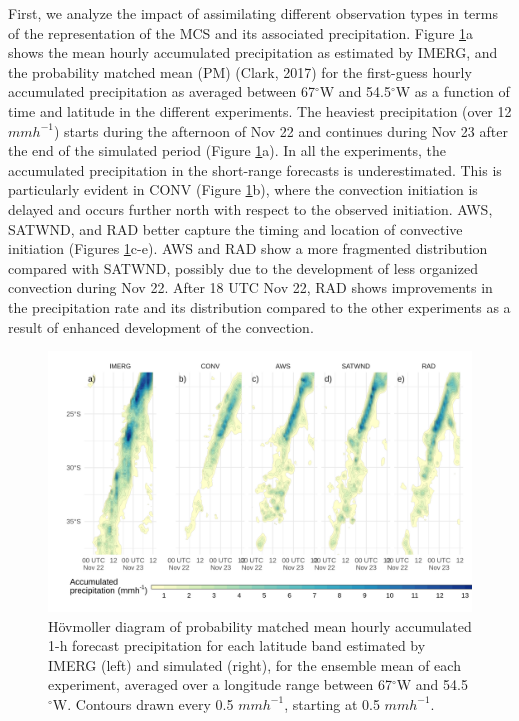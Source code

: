 \documentclass[final,5p,times,twocolumn,authoryear]{elsarticle} %
\begin{document}
First, we analyze the impact of assimilating different observation types in terms of the representation of the MCS and its associated precipitation. Figure \ref{fig:pp-hov}a shows the mean hourly accumulated precipitation as estimated by IMERG, and the probability matched mean (PM) (Clark, 2017) for the first-guess hourly accumulated precipitation as averaged between 67\(^{\circ}\)W and 54.5\(^{\circ}\)W as a function of time and latitude in the different experiments. The heaviest precipitation (over 12 \(mmh^{-1}\)) starts during the afternoon of Nov 22 and continues during Nov 23 after the end of the simulated period (Figure \ref{fig:pp-hov}a). In all the experiments, the accumulated precipitation in the short-range forecasts is underestimated. This is particularly evident in CONV (Figure \ref{fig:pp-hov}b), where the convection initiation is delayed and occurs further north with respect to the observed initiation. AWS, SATWND, and RAD better capture the timing and location of convective initiation (Figures \ref{fig:pp-hov}c-e). AWS and RAD show a more fragmented distribution compared with SATWND, possibly due to the development of less organized convection during Nov 22. After 18 UTC Nov 22, RAD shows improvements in the precipitation rate and its distribution compared to the other experiments as a result of enhanced development of the convection.



\begin{figure}[h]
\includegraphics{../figures/pp-hov-1} \caption{Hövmoller diagram of probability matched mean hourly accumulated 1-h forecast precipitation for each latitude band estimated by IMERG (left) and simulated (right), for the ensemble mean of each experiment, averaged over a longitude range between 67\(^{\circ}\)W and 54.5\(^{\circ}\)W. Contours drawn every 0.5 \(mmh^{-1}\), starting at 0.5 \(mmh^{-1}\).}\label{fig:pp-hov}
\end{figure}
\end{document}
